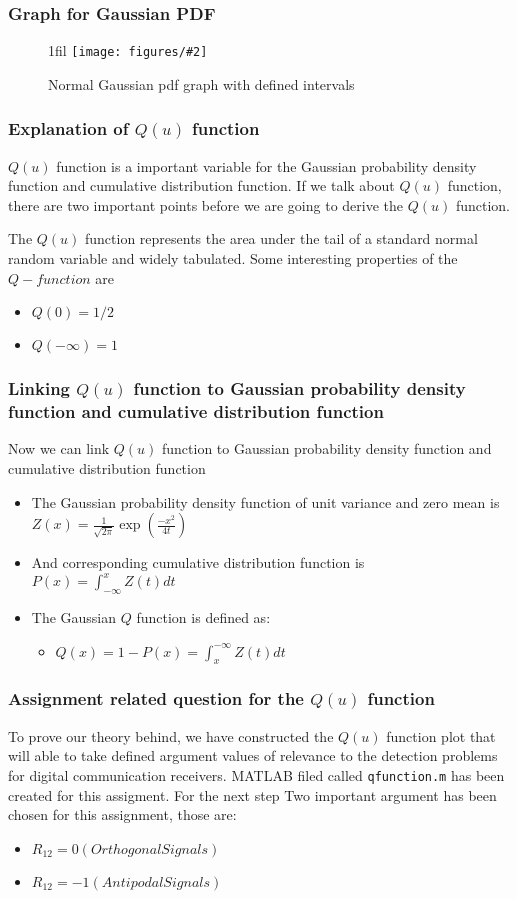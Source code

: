 \documentclass{beamer}
\makeatletter
\newcommand{\code}[1]{\texttt{#1}}
\newcommand*{\centerfloat}{%
  \parindent \z@
  \leftskip \z@ \@plus 1fil \@minus \textwidth
  \rightskip\leftskip
  \parfillskip \z@skip}
\newcommand{\fig}[3]{
  \begin{figure}[H]
  \centerfloat
    \texttt{[image: figures/\#2]}
    \caption{#3}
  \end{figure}
}
\makeatother
\begin{document}
\begin{frame}
	\frametitle{Graph for Gaussian PDF}
\fig{5cm}{normalgaussiangraph.png}{Normal Gaussian pdf graph with defined intervals}
\end{frame}

\begin{frame}
	\frametitle{Explanation of $Q(u)$ function}
	$Q(u)$ function is a important variable for the Gaussian probability density function and cumulative distribution function. If we talk about $Q(u)$  function, there are two important points before we are going to derive the $Q(u)$ function.

	The $Q(u)$ function represents the area under the tail of a standard normal random variable and widely tabulated. Some interesting properties of the $Q- function$ are
	\begin{itemize}
		\item $Q(0)=1/2$
		\item $Q(-\infty)=1$
	\end{itemize}
\end{frame}
\begin{frame}
	\frametitle{Linking $Q(u)$ function to Gaussian probability density function and cumulative distribution function}
Now we can link $Q(u)$ function to Gaussian probability density function and cumulative distribution function 
\begin{itemize}
	\item The Gaussian probability density function of unit variance and zero mean is $Z(x)=\frac{1}{\sqrt{2\pi}} \exp(\frac{-x^2}{4t})$
	\item And corresponding cumulative distribution function is $P(x)=\int_{-\infty}^{x} Z(t) dt$
	\item The Gaussian $Q$ function is defined as:
		\begin{itemize}
			\item $ Q(x) = 1-P(x)=\int_{x}^{-\infty} Z(t) dt$
		\end{itemize}
\end{itemize}
\end{frame}

\begin{frame}
	\frametitle{Assignment related question for the $Q(u)$ function}
To prove our theory behind, we have constructed the $Q(u)$ function plot that will able to take defined argument
values of relevance to the detection problems for digital communication receivers. MATLAB filed called \code{qfunction.m} has been created for this assigment. For the next step 
Two important argument has been chosen for this assignment, those are:
	\begin{itemize}
		\item $R_12= 0 (Orthogonal Signals)$
		\item $R_12= -1( Antipodal Signals) $
	\end{itemize}
\end{frame}
\end{document}
